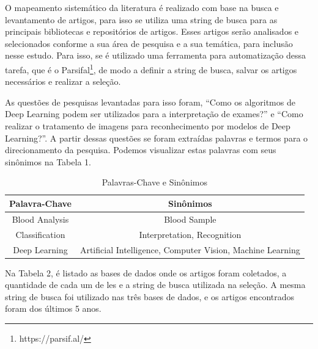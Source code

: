 O mapeamento sistemático da literatura é realizado com base na busca e levantamento de artigos, para isso se utiliza uma string de busca para as principais bibliotecas e repositórios de artigos. Esses artigos serão analisados e selecionados conforme a sua área de pesquisa e a sua temática, para inclusão nesse estudo. Para isso, se é utilizado uma ferramenta para automatização dessa tarefa, que é o Parsifal\footnote[1]{https://parsif.al/}, de modo a definir a string de busca, salvar os artigos necessários e realizar a seleção.

As questões de pesquisas levantadas para isso foram, ``Como os algoritmos de Deep Learning podem ser utilizados para a interpretação de exames?'' e ``Como realizar o tratamento de imagens para reconhecimento por modelos de Deep Learning?''. A partir dessas questões se foram extraídas palavras e termos para o direcionamento da pesquisa. Podemos visualizar estas palavras com seus sinônimos na Tabela 1.

\begin{table}[!htb]
\centering
\caption{Palavras-Chave e Sinônimos}
\label{tbl:palavrasChave}
\begin{tabular}{|c|c|}
\hline
\textbf{Palavra-Chave} & \textbf{Sinônimos} \\ \hline
Blood Analysis & Blood Sample \\ \hline
Classification & Interpretation, Recognition \\ \hline
Deep Learning & Artificial Intelligence, Computer Vision, Machine Learning \\ \hline
\end{tabular}
\vspace{6pt}
\end{table}

Na Tabela 2, é listado as bases de dados onde os artigos foram coletados, a quantidade de cada um de les e a string de busca utilizada na seleção. A mesma string de busca foi utilizado nas três bases de dados, e os artigos encontrados foram dos últimos 5 anos.

